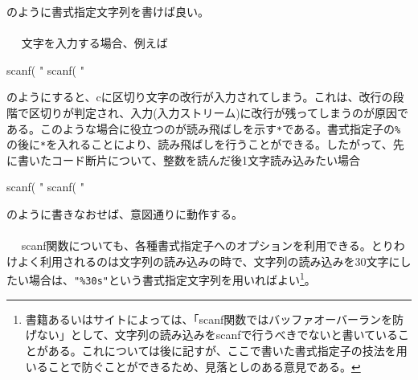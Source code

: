 のように書式指定文字列を書けば良い。
\\ \\　
文字を入力する場合、例えば
\begin{code}
scanf( "%
scanf( "%
\end{code}
のようにすると、cに区切り文字の改行が入力されてしまう。これは、改行の段階で区切りが判定され、入力(入力ストリーム)に改行が残ってしまうのが原因である。このような場合に役立つのが読み飛ばしを示す\verb|*|である。書式指定子の\verb|%|の後に\verb|*|を入れることにより、読み飛ばしを行うことができる。したがって、先に書いたコード断片について、整数を読んだ後1文字読み込みたい場合
\begin{code}
scanf( "%
scanf( "%
\end{code}
のように書きなおせば、意図通りに動作する。
\\ \\　
scanf関数についても、各種書式指定子へのオプションを利用できる。とりわけよく利用されるのは文字列の読み込みの時で、文字列の読み込みを30文字にしたい場合は、\verb|"%30s"|という書式指定文字列を用いればよい\footnote{書籍あるいはサイトによっては、「scanf関数ではバッファオーバーランを防げない」として、文字列の読み込みをscanfで行うべきでないと書いていることがある。これについては後に記すが、ここで書いた書式指定子の技法を用いることで防ぐことができるため、見落としのある意見である。}。

